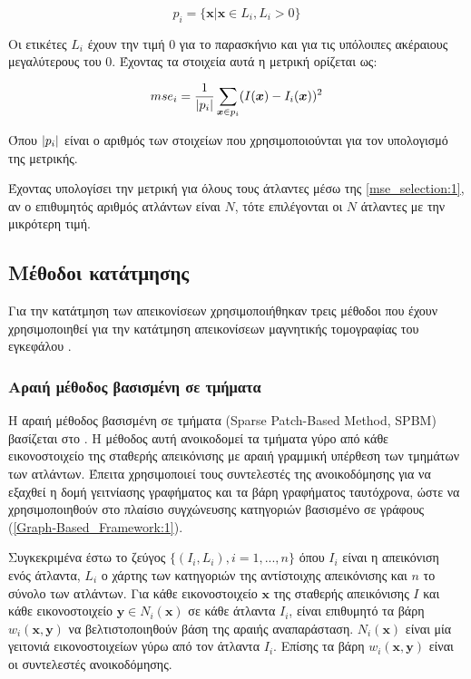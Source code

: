 \documentclass[a4paper,12pt]{article}
\DeclarePairedDelimiter\abs{\lvert}{\rvert}
\begin{document}
\begin{equation*}
    p_i = \{\bm{x}| \bm{x} \in L_i, L_i > 0 \}
\end{equation*}

Οι ετικέτες $L_i$ έχουν την τιμή $0$ για το παρασκήνιο και για τις υπόλοιπες
ακέραιους μεγαλύτερους του $0$. Έχοντας τα στοιχεία αυτά η μετρική ορίζεται ως:

\begin{equation} \label{mse_selection:1}
    mse_i = \frac {1} {\abs{p_i}} \sum_{\bm{x} \in p_i} ( I(\bm{x}) -
                I_i(\bm{x})  )^2
\end{equation}

Όπου $\abs{p_i}$ είναι ο αριθμός των στοιχείων που χρησιμοποιούνται για τον
υπολογισμό της μετρικής.

Έχοντας υπολογίσει την μετρική για όλους τους άτλαντες μέσω της
\eqref{mse_selection:1}, αν ο επιθυμητός αριθμός ατλάντων είναι $N$, τότε
επιλέγονται οι $N$ άτλαντες με την μικρότερη τιμή.


\subsection{Μέθοδοι κατάτμησης}

Για την κατάτμηση των απεικονίσεων χρησιμοποιήθηκαν τρεις μέθοδοι που έχουν
χρησιμοποιηθεί για την κατάτμηση απεικονίσεων μαγνητικής τομογραφίας του
εγκεφάλου \cite{Zhang:1} \cite{Tong:1} \cite{Coupe:1}.

\subsubsection{Αραιή μέθοδος βασισμένη σε τμήματα} \label{SPBM:1}

Η αραιή μέθοδος βασισμένη σε τμήματα (Sparse Patch-Based Method, SPBM) βασίζεται
στο \cite{Zhang:1}. Η μέθοδος αυτή ανοικοδομεί τα τμήματα γύρο από κάθε
εικονοστοιχείο της σταθερής απεικόνισης με αραιή γραμμική υπέρθεση των τμημάτων
των ατλάντων. Έπειτα χρησιμοποιεί τους συντελεστές της ανοικοδόμησης για να
εξαχθεί η δομή γειτνίασης γραφήματος και τα βάρη γραφήματος ταυτόχρονα, ώστε να
χρησιμοποιηθούν στο πλαίσιο συγχώνευσης κατηγοριών βασισμένο σε γράφους
(\ref{Graph-Based_Framework:1}).

Συγκεκριμένα έστω το ζεύγος $\{(I_i,L_i), i=1,...,n\}$ όπου $I_i$ είναι η
απεικόνιση ενός άτλαντα, $L_i$ ο χάρτης των κατηγοριών της αντίστοιχης
απεικόνισης και $n$ το σύνολο των ατλάντων. Για κάθε εικονοστοιχείο $\bm{x}$ της
σταθερής απεικόνισης $I$ και κάθε εικονοστοιχείο $\bm{y} \in N_i(\bm{x})$ σε
κάθε άτλαντα $I_i$, είναι επιθυμητό τα βάρη $w_i(\bm{x},\bm{y})$ να
βελτιστοποιηθούν βάση της αραιής αναπαράσταση. $N_i(\bm{x})$ είναι μία γειτονιά
εικονοστοιχείων γύρω από τον άτλαντα $I_i$. Επίσης τα βάρη $w_i(\bm{x},\bm{y})$
είναι οι συντελεστές ανοικοδόμησης.
\end{document}
